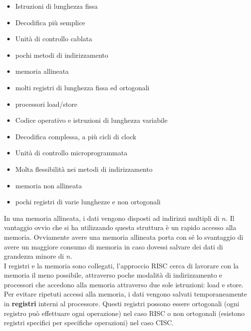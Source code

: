\documentclass[../ace.tex]{subfiles}
\begin{document}
\vspace{10pt}
\noindent\begin{minipage}{.48\textwidth}
    \begin{tcolorbox}[title={\centering RISC}]
        \begin{itemize}[leftmargin=*]
            \item Istruzioni di lunghezza fissa
            \item Decodifica più semplice
            \item Unità di controllo cablata
            \item pochi metodi di indirizzamento
            \item memoria allineata
            \item molti registri di lunghezza fissa ed ortogonali
            \item processori load/store
        \end{itemize}
    \end{tcolorbox}
\end{minipage}
\begin{minipage}{.51\textwidth}
    \begin{tcolorbox}[title={\centering CISC}]
        \begin{itemize}[leftmargin=*]
            \item Codice operativo e istruzioni di lunghezza variabile
            \item Decodifica complessa, a più cicli di clock
            \item Unità di controllo microprogrammata
            \item Molta flessibilità nei metodi di indirizzamento
            \item memoria non allineata
            \item pochi registri di varie lunghezze e non ortogonali
        \end{itemize}
    \end{tcolorbox}
\end{minipage}
\vspace{10pt}

In una memoria allineata, i dati vengono disposti ad indirizzi multipli di $n$.
Il vantaggio ovvio che si ha utilizzando questa struttura è un rapido accesso alla memoria.
Ovviamente avere una memoria allineata porta con sé lo svantaggio di avere un maggiore consumo di memoria in
caso dovessi salvare dei dati di grandezza minore di $n$.
\\
I registri e la memoria sono collegati, l'approccio RISC cerca di lavorare con la memoria il meno
possibile, attraverso poche modalità di indirizzamento e processori che accedono alla memoria attraverso
due sole istruzioni: load e store.
Per evitare ripetuti accessi alla memoria, i dati vengono salvati temporaneamente in \textbf{registri} interni
al processore. Questi registri possono essere ortogonali (ogni registro può effettuare ogni operazione) nel
caso RISC o non ortogonali (esistono registri specifici per specifiche operazioni) nel caso CISC.
\end{document}
